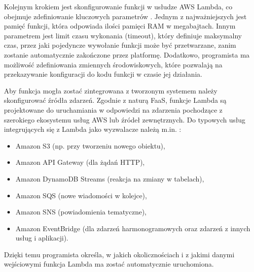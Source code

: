 Kolejnym krokiem jest skonfigurowanie funkcji w usłudze AWS Lambda, co obejmuje zdefiniowanie kluczowych parametrów \cite{awsLambdaDocs}.
Jednym z najważniejszych jest pamięć funkcji, która odpowiada ilości pamięci RAM w megabajtach.
Innym parametrem jest limit czasu wykonania (timeout), który definiuje maksymalny czas, przez jaki pojedyncze wywołanie funkcji może być przetwarzane, zanim zostanie automatycznie zakończone przez platformę. 
Dodatkowo, programista ma możliwość zdefiniowania zmiennych środowiskowych, które pozwalają na przekazywanie konfiguracji do kodu funkcji w czasie jej działania.

Aby funkcja mogła zostać zintegrowana z tworzonym systemem należy skonfigurować źródła zdarzeń.
Zgodnie z naturą FaaS, funkcje Lambda są projektowane do uruchamiania w odpowiedzi na zdarzenia pochodzące z szerokiego ekosystemu usług AWS lub źródeł zewnętrznych.
Do typowych usług integrujących się z Lambda jako wyzwalacze należą m.in. \cite{awsLambdaDocs}:
\begin{itemize}
    \item Amazon S3 (np. przy tworzeniu nowego obiektu),
    \item Amazon API Gateway (dla żądań HTTP),
    \item Amazon DynamoDB Streams (reakcja na zmiany w tabelach),
    \item Amazon SQS (nowe wiadomości w kolejce),
    \item Amazon SNS (powiadomienia tematyczne),
    \item Amazon EventBridge (dla zdarzeń harmonogramowych oraz zdarzeń z innych usług i aplikacji).
\end{itemize}
Dzięki temu programista określa, w jakich okolicznościach i z jakimi danymi wejściowymi funkcja Lambda ma zostać automatycznie uruchomiona.



